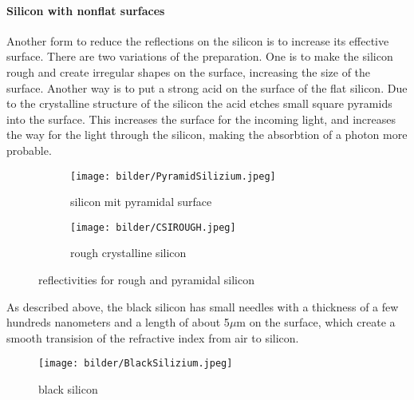 \paragraph{Silicon with nonflat surfaces}
Another form to reduce the reflections on the silicon is to increase its effective
surface. There are two variations of the preparation.
One is to make the silicon rough and create irregular shapes on the surface, increasing the size of the surface.
Another way is to put a strong acid on the surface of the flat silicon.
Due to the crystalline structure of the silicon the acid etches small square pyramids into the surface.
This increases the surface for the incoming light, and increases the way for the light through the silicon,
making the absorbtion of a photon more probable. 
\begin{figure}[h]
  \centering
  \begin{subfigure}[b]{0.45\textwidth}
    \texttt{[image: bilder/PyramidSilizium.jpeg]}
    \caption{silicon mit pyramidal surface}
    \label{fig:pyramidsilizium}
  \end{subfigure}
  \begin{subfigure}[b]{0.45\textwidth}
    \texttt{[image: bilder/CSIROUGH.jpeg]}
    \caption{rough crystalline silicon}
    \label{fig:csirough}
  \end{subfigure}
  \caption{reflectivities for rough and pyramidal silicon}
\end{figure}
As described above, the black silicon has small needles with a thickness of a few hundreds nanometers and a length
of about 5$\mu$m on the surface,
which create a smooth transision of the refractive index from air to silicon.
\begin{figure}[h]
  \centering
  \texttt{[image: bilder/BlackSilizium.jpeg]}
  \caption{black silicon}
  \label{fig:blacksilizium}
\end{figure}


